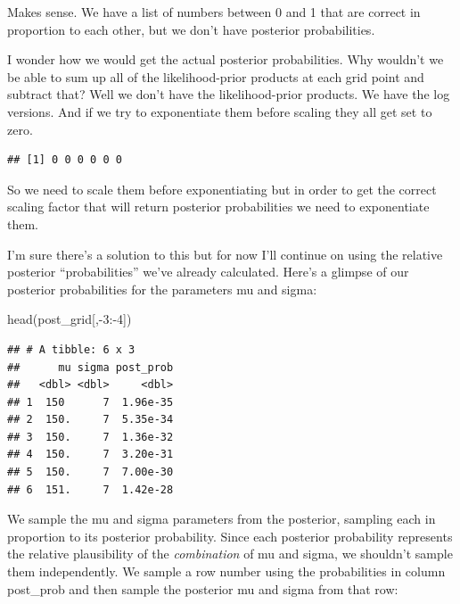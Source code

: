 \documentclass[
]{book}
\newenvironment{Shaded}{\begin{snugshade}}{\end{snugshade}}
\newcommand{\DecValTok}[1]{\textcolor[rgb]{0.00,0.00,0.81}{#1}}
\newcommand{\FunctionTok}[1]{\textcolor[rgb]{0.00,0.00,0.00}{#1}}
\newcommand{\NormalTok}[1]{#1}
\newcommand{\SpecialCharTok}[1]{\textcolor[rgb]{0.00,0.00,0.00}{#1}}
\begin{document}
Makes sense. We have a list of numbers between 0 and 1 that are correct in proportion to each other, but we don't have posterior probabilities.

I wonder how we would get the actual posterior probabilities. Why wouldn't we be able to sum up all of the likelihood-prior products at each grid point and subtract that? Well we don't have the likelihood-prior products. We have the log versions. And if we try to exponentiate them before scaling they all get set to zero.

\begin{Shaded}
\end{Shaded}

\begin{verbatim}
## [1] 0 0 0 0 0 0
\end{verbatim}

So we need to scale them before exponentiating but in order to get the correct scaling factor that will return posterior probabilities we need to exponentiate them.

I'm sure there's a solution to this but for now I'll continue on using the relative posterior ``probabilities'' we've already calculated. Here's a glimpse of our posterior probabilities for the parameters mu and sigma:

\begin{Shaded}
\begin{Highlighting}[]
\FunctionTok{head}\NormalTok{(post\_grid[,}\SpecialCharTok{{-}}\DecValTok{3}\SpecialCharTok{:{-}}\DecValTok{4}\NormalTok{])}
\end{Highlighting}
\end{Shaded}

\begin{verbatim}
## # A tibble: 6 x 3
##      mu sigma post_prob
##   <dbl> <dbl>     <dbl>
## 1  150      7  1.96e-35
## 2  150.     7  5.35e-34
## 3  150.     7  1.36e-32
## 4  150.     7  3.20e-31
## 5  150.     7  7.00e-30
## 6  151.     7  1.42e-28
\end{verbatim}

We sample the mu and sigma parameters from the posterior, sampling each in proportion to its posterior probability. Since each posterior probability represents the relative plausibility of the \emph{combination} of mu and sigma, we shouldn't sample them independently. We sample a row number using the probabilities in column post\_prob and then sample the posterior mu and sigma from that row:
\end{document}
